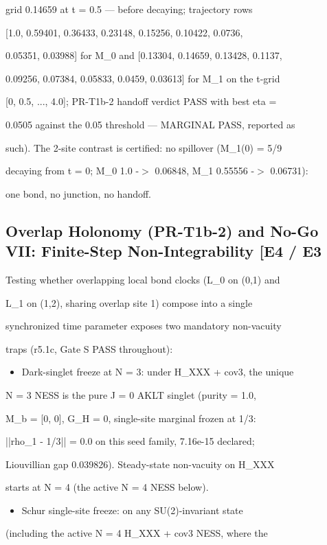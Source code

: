 \documentclass[11pt,a4paper]{article}
\theoremstyle{definition}
\begin{document}
grid 0.14659 at t = 0.5 — before decaying; trajectory rows

[1.0, 0.59401, 0.36433, 0.23148, 0.15256, 0.10422, 0.0736,

0.05351, 0.03988] for M\_0 and [0.13304, 0.14659, 0.13428, 0.1137,

0.09256, 0.07384, 0.05833, 0.0459, 0.03613] for M\_1 on the t-grid

[0, 0.5, ..., 4.0]; PR-T1b-2 handoff verdict PASS with best eta =

0.0505 against the 0.05 threshold — MARGINAL PASS, reported as

such). The 2-site contrast is certified: no spillover (M\_1(0) = 5/9

decaying from t = 0; M\_0 1.0 -$>$ 0.06848, M\_1 0.55556 -$>$ 0.06731):

one bond, no junction, no handoff.


\subsection{Overlap Holonomy (PR-T1b-2) and No-Go VII: Finite-Step Non-Integrability [E4 / E3}

Testing whether overlapping local bond clocks (L\_0 on (0,1) and

L\_1 on (1,2), sharing overlap site 1) compose into a single

synchronized time parameter exposes two mandatory non-vacuity

traps (r5.1c, Gate S PASS throughout):


\begin{itemize}[leftmargin=1.4em]
\item Dark-singlet freeze at N = 3: under H\_XXX + cov3, the unique
\end{itemize}
    N = 3 NESS is the pure J = 0 AKLT singlet (purity = 1.0,

    M\_b = [0, 0], G\_H = 0, single-site marginal frozen at 1/3:

    ||rho\_1 - 1/3|| = 0.0 on this seed family, 7.16e-15 declared;

    Liouvillian gap 0.039826). Steady-state non-vacuity on H\_XXX

    starts at N = 4 (the active N = 4 NESS below).

\begin{itemize}[leftmargin=1.4em]
\item Schur single-site freeze: on any SU(2)-invariant state
\end{itemize}
    (including the active N = 4 H\_XXX + cov3 NESS, where the
\end{document}
